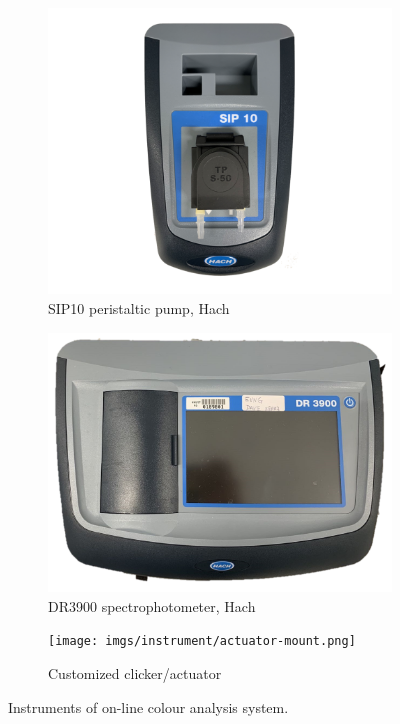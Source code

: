 \begin{figure}[h]
    \centering
    \begin{subfigure}{0.3\textwidth}
      \includegraphics[width=\linewidth]{imgs/instrument/SIP10.png}
      \caption{SIP10 peristaltic pump, Hach} \label{fig:hach-sip}
    \end{subfigure}%
    \hspace{2em}   %
    \begin{subfigure}{0.3\textwidth}
      \includegraphics[width=\linewidth]{imgs/instrument/DR3900_PS.png}
      \caption{DR3900 spectrophotometer, Hach} \label{fig:hach-dr3900}
    \end{subfigure}%
    \vspace{2em}
    \begin{subfigure}{0.7\textwidth}
        \texttt{[image: imgs/instrument/actuator-mount.png]}
        \caption{Customized clicker/actuator} \label{fig:hach-actuator}
    \end{subfigure}%
  \caption{Instruments of on-line colour analysis system.} \label{fig:hach}
\end{figure}

